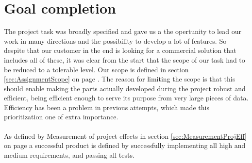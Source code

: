 \documentclass[11pt,a4paper,titlepage,oneside]{report}
\begin{document}
\section{Goal completion}
The project task was broadly specified and gave us a the opertunity to lead our work in many directions and the possibility to develop a lot of features. So despite that our customer in the end is looking for a commercial solution that includes all of these, it was clear from the start that the scope of our task had to be reduced to a tolerable level. Our scope is defined in section \ref{sec:AssignmentScope} on page \pageref{sec:AssignmentScope}. The reason for limiting the scope is that this should enable making the parts actually developed during the project robust and efficient, being efficient enough to serve its purpose from very large pieces of data. Efficiency has been a problem in previous attempts, which made this prioritization one of extra importance. \\ \\
As defined by Measurement of project effects in section \ref{sec:MeasurementProjEff} on page \pageref{sec:MeasurementProjEff} a successful product is defined by successfully implementing all high and medium requirements, and passing all tests.
\end{document}
